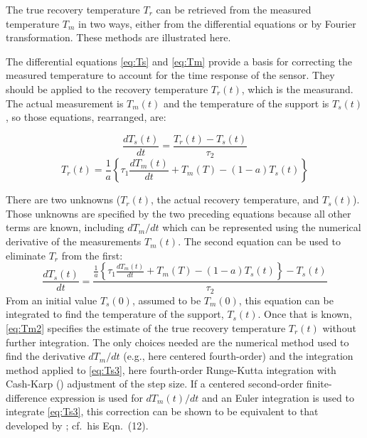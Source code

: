 \documentclass[11pt,twoside,american,12pt,twoside,american]{article}\usepackage[]{graphicx}\usepackage[]{color}
\begin{document}
The true recovery temperature $T_{r}$ can be retrieved from the measured
temperature $T_{m}$ in two ways, either from the differential equations
or by Fourier transformation. These methods are illustrated here.

The differential equations \eqref{eq:Ts} and \eqref{eq:Tm} provide
a basis for correcting the measured temperature to account for the
time response of the sensor. They should be applied to the recovery
temperature $T_{r}(t)$, which is the measurand. The actual measurement
is $T_{m}(t)$ and the temperature of the support is $T_{s}(t)$,
so those equations, rearranged, are:

\begin{equation}
\frac{dT_{s}(t)}{dt}=\frac{T_{r}(t)-T_{s}(t)}{\tau_{2}}\label{eq:Ts2}
\end{equation}
\begin{equation}
T_{r}(t)=\frac{1}{a}\left\{ \tau_{1}\frac{dT_{m}(t)}{dt}+T_{m}(T)-(1-a)T_{s}(t)\right\} \label{eq:Tm2}
\end{equation}

There are two unknowns ($T_{r}(t)$, the actual recovery temperature,
and $T_{s}(t)$). Those unknowns are specified by the two preceding
equations because all other terms are known, including $dT_{m}/dt$
which can be represented using the numerical derivative of the measurements
$T_{m}(t)$. The second equation can be used to eliminate $T_{r}$
from the first:\\
\begin{equation}
\frac{dT_{s}(t)}{dt}=\frac{\frac{1}{a}\left\{ \tau_{1}\frac{dT_{m}(t)}{dt}+T_{m}(T)-(1-a)T_{s}(t)\right\} -T_{s}(t)}{\tau_{2}}\label{eq:Ts3}
\end{equation}
From an initial value $T_{s}(0)$, assumed to be $T_{m}(0)$, this
equation can be integrated to find the temperature of the support,
$T_{s}(t)$. Once that is known, \eqref{eq:Tm2} specifies the estimate
of the true recovery temperature $T_{r}(t)$ without further integration.
The only choices needed are the numerical method used to find the
derivative $dT_{m}/dt$ (e.g., here centered fourth-order) and the
integration method applied to \eqref{eq:Ts3}, here fourth-order Runge-Kutta
integration with Cash-Karp (\citet{cash1990variable}) adjustment
of the step size. If a centered second-order finite-difference expression
is used for $dT_{m}(t)/dt$ and an Euler integration is used to integrate
\eqref{eq:Ts3}, this correction can be shown to be equivalent to
that developed by \citet{InverarityJTech2000}; cf.~his Eqn.~(12).
\end{document}
